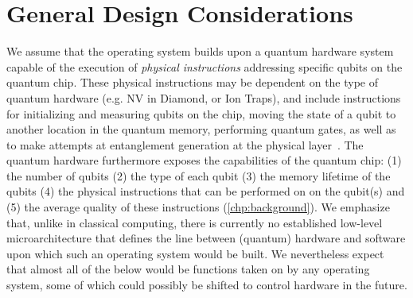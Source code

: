 \section{General Design Considerations}
\label{sec:arch:considerations}

We assume that the operating system builds upon a quantum hardware system capable of the execution
of \emph{physical instructions} addressing specific qubits on the quantum chip. These physical
instructions may be dependent on the type of quantum hardware (e.g. NV in Diamond, or Ion Traps),
and include instructions for initializing and measuring qubits on the chip, moving the state of a
qubit to another location in the quantum memory, performing quantum gates, as well as to make
attempts at entanglement generation at the physical layer~\cite{pompili_2022_experimental}. The
quantum hardware furthermore exposes the capabilities of the quantum chip: (1) the number of qubits
(2) the type of each qubit (3) the memory lifetime of the qubits (4) the physical instructions that
can be performed on on the qubit(s) and (5) the average quality of these instructions
(\cref{chp:background}). We emphasize that, unlike in classical computing, there is currently no
established low-level microarchitecture that defines the line between (quantum) hardware and
software upon which such an operating system would be built. We nevertheless expect that almost all
of the below would be functions taken on by any operating system, some of which could possibly be
shifted to control hardware in the future.

